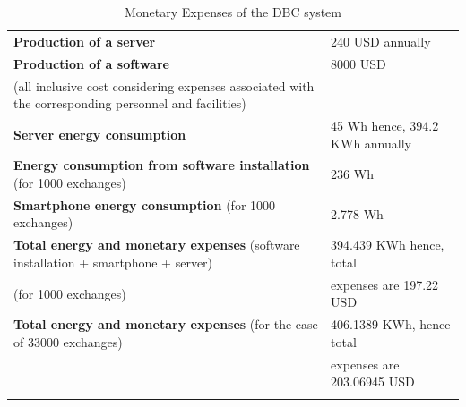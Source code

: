 \documentclass[3p,times,procedia]{elsarticle}
\begin{document}
\begin{table}[h]
\label{PBCcalc}
\caption{Monetary Expenses of the DBC system}
\begin{tabular*}{\hsize}{@{\extracolsep{\fill}}ll@{}}
\colrule
\textbf{Production of a server} & 240 USD annually \\
\textbf{Production of a software}  &   8000 USD \\
(all inclusive cost considering expenses associated with the corresponding personnel and facilities) &  \\
\textbf{Server energy consumption} &  45 Wh hence, 394.2 KWh annually \\
\textbf{Energy consumption from software installation} (for 1000 exchanges) &  236 Wh \\
\textbf{Smartphone energy consumption} (for 1000 exchanges) &  2.778 Wh \\
\textbf{Total energy and monetary expenses} (software installation + smartphone + server) &  394.439 KWh hence, total \\
(for 1000 exchanges) & expenses are 197.22 USD \\
\textbf{Total energy and monetary expenses} (for the case of 33000 exchanges) & 406.1389 KWh,  hence total  \\
& expenses are 203.06945 USD  \\
\botrule
\end{tabular*}
\end{table}
\vspace{-0.5cm}
\end{document}
